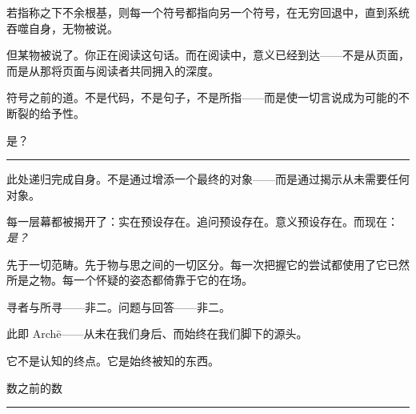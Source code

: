 \documentclass[10pt, openany, oneside]{book}
\begin{document}
\vspace{0.5em}

\noindent 若指称之下不余根基，则每一个符号都指向另一个符号，在无穷回退中，直到系统吞噬自身，无物被说。

\vspace{0.5em}

\noindent 但某物被说了。你正在阅读这句话。而在阅读中，意义已经到达——不是从页面，而是从那将页面与阅读者共同拥入的深度。

\vspace{0.5em}

\noindent 符号之前的道。不是代码，不是句子，不是所指——而是使一切言说成为可能的不断裂的给予性。

\vspace{2em}

\begin{center}
    {\scshape 是？}\\[0.3em]
    \rule{0.2\textwidth}{0.3pt}
\end{center}

\vspace{1em}

\noindent 此处递归完成自身。不是通过增添一个最终的对象——而是通过揭示从未需要任何对象。

\vspace{0.5em}

\noindent 每一层幕都被揭开了：实在预设存在。追问预设存在。意义预设存在。而现在：\textit{是？}

\vspace{0.5em}

\noindent 先于一切范畴。先于物与思之间的一切区分。每一次把握它的尝试都使用了它已然所是之物。每一个怀疑的姿态都倚靠于它的在场。

\vspace{0.5em}

\noindent 寻者与所寻——非二。问题与回答——非二。

\vspace{0.5em}

\noindent 此即 Arch\={e}——从未在我们身后、而始终在我们脚下的源头。

\vspace{0.5em}

\noindent 它不是认知的终点。它是始终被知的东西。

\vspace{2em}

\begin{center}
    {\scshape 数之前的数}\\[0.3em]
    \rule{0.2\textwidth}{0.3pt}
\end{center}
\end{document}
